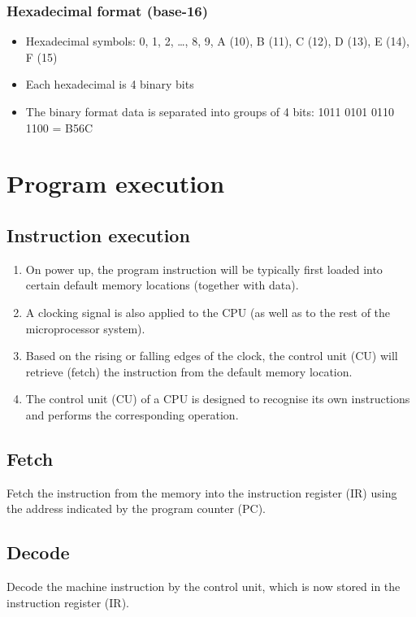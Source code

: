 \documentclass[11pt]{article}
\begin{document}
\subsubsection{Hexadecimal format (base-16)}
\label{sec:org3cf67af}
\begin{itemize}
\item Hexadecimal symbols: 0, 1, 2, \ldots{}, 8, 9, A (10), B (11), C (12), D (13), E (14), F (15)
\item Each hexadecimal is 4 binary bits
\item The binary format data is separated into groups of 4 bits:
1011 0101 0110 1100 = B56C
\end{itemize}


\section{Program execution}
\label{sec:org7da2e39}

\subsection{Instruction execution}
\label{sec:org13c7c11}
\begin{enumerate}
\item On power up, the program instruction will be typically first loaded into certain default memory locations (together with data).
\item A clocking signal is also applied to the CPU (as well as to the rest of the microprocessor system).
\item Based on the rising or falling edges of the clock, the control unit (CU) will retrieve (fetch) the instruction from the default memory location.
\item The control unit (CU) of a CPU is designed to recognise its own instructions and performs the corresponding operation.
\end{enumerate}

 \newpage

\subsection{Fetch}
\label{sec:org2bfb600}
Fetch the instruction from the memory into the instruction register (IR) using the address indicated by the program counter (PC).

\subsection{Decode}
\label{sec:org229efab}
Decode the machine instruction by the control unit, which is now stored in the instruction register (IR).
\end{document}
